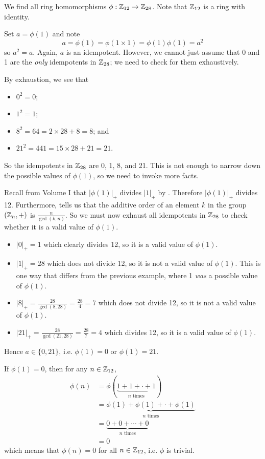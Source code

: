 \begin{example}
    We find all ring homomorphisms $\phi: \mathbb{Z}_{12} \to \mathbb{Z}_{28}$. Note that $\mathbb{Z}_{12}$ is a ring with identity.

    Set $a = \phi(1)$ and note
    \[
        a = \phi(1) = \phi(1\times1) = \phi(1)\phi(1) = a^2
    \]
    so $a^2 = a$. Again, $a$ is an idempotent. However, we cannot just assume that 0 and 1 are the \textit{only} idempotents in $\mathbb{Z}_{28}$; we need to check for them exhaustively.

    By exhaustion, we see that
    \begin{itemize}
        \item $0^2 = 0$;
        \item $1^2 = 1$;
        \item $8^2 = 64 = 2 \times 28 + 8 = 8$; and
        \item $21^2 = 441 = 15 \times 28 + 21 = 21$.
    \end{itemize}
    So the idempotents in $\mathbb{Z}_{28}$ are 0, 1, 8, and 21. This is not enough to narrow down the possible values of $\phi(1)$, so we need to invoke more facts.

    Recall from Volume I that $|\phi(1)|_+$ divides $|1|_+$ by . Therefore $|\phi(1)|_+$ divides 12. Furthermore,  tells us that the additive order of an element $k$ in the group $(\mathbb{Z}_n, +)$ is $\frac{n}{\gcd(k,n)}$. So we must now exhaust all idempotents in $\mathbb{Z}_{28}$ to check whether it is a valid value of $\phi(1)$.
    \begin{itemize}
        \item $|0|_+ = 1$ which clearly divides 12, so it is a valid value of $\phi(1)$.
        \item $|1|_+ = 28$ which does not divide 12, so it is not a valid value of $\phi(1)$. This is one way that differs from the previous example, where 1 \textit{was} a possible value of $\phi(1)$.
        \item $|8|_+ = \frac{28}{\gcd(8,28)} = \frac{28}4 = 7$ which does not divide 12, so it is not a valid value of $\phi(1)$.
        \item $|21|_+ = \frac{28}{\gcd(21,28)} = \frac{28}7 = 4$ which divides 12, so it is a valid value of $\phi(1)$.
    \end{itemize}
    Hence $a \in \{0, 21\}$, i.e. $\phi(1) = 0$ or $\phi(1) = 21$.

    If $\phi(1) = 0$, then for any $n \in \mathbb{Z}_{12}$,
    \begin{align*}
        \phi(n) &= \phi(\underbrace{1 + 1 + \cdot + 1}_{n \text{ times}})\\
        &= \underbrace{\phi(1) + \phi(1) + \cdot + \phi(1)}_{n \text{ times}}\\
        &= \underbrace{0 + 0 + \cdots + 0}_{n \text{ times}}\\
        &= 0
    \end{align*}
    which means that $\phi(n) = 0$ for all $n \in \mathbb{Z}_{12}$, i.e. $\phi$ is trivial.


\end{example}
